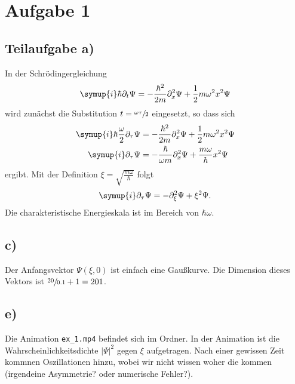 \section*{Aufgabe 1}
\subsection*{Teilaufgabe a)}
In der Schrödingergleichung 
\begin{equation*}
    \symup{i} \hbar \partial_t \Psi  =- \frac{\hbar^2}{2m} \partial_x^2 \Psi + \frac{1}{2}m \omega^2 x^2 \Psi
\end{equation*}
wird zunächst die Substitution $t = \sfrac{\omega \tau}{2}$ eingesetzt, so dass sich 
\begin{align*}
    \symup{i} \hbar \frac{\omega}{2}\partial_{\tau} \Psi &=- \frac{\hbar^2}{2m} \partial_x^2 \Psi + \frac{1}{2}m \omega^2 x^2 \Psi \\
    \symup{i} \partial_{\tau} \Psi &=- \frac{\hbar}{\omega m} \partial_x^2 \Psi + \frac{m\omega}{\hbar} x^2 \Psi 
\end{align*}
ergibt.
Mit der Definition $\xi = \sqrt{\frac{m\omega}{\hbar}}$ folgt 
\begin{equation*}
    \symup{i} \partial_{\tau} \Psi =- \partial_{\xi}^2 \Psi + \xi^2 \Psi .
\end{equation*}
Die charakteristische Energieskala ist im Bereich von $\hbar \omega$.
\subsection*{c)}
Der Anfangsvektor $\Psi ( \xi, 0)$ ist einfach eine Gaußkurve.
Die Dimension dieses Vektors ist $\sfrac{20}{0.1} + 1 = 201$.
\subsection*{e)}
Die Animation \verb|ex_1.mp4|   befindet sich im Ordner. 
In der Animation ist die Wahrscheinlichkeitsdichte $|\Psi|^2$ gegen $\xi$ aufgetragen.
Nach einer gewissen Zeit kommnen Oszillationen hinzu, wobei wir nicht wissen woher die kommen (irgendeine Asymmetrie? oder numerische Fehler?).